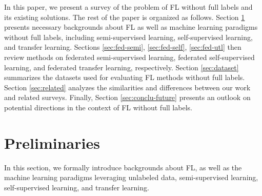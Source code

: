\documentclass[11pt]{article}
\begin{document}
In this paper, we present a survey of the problem of FL without full labels and its existing solutions. The rest of the paper is organized as follows. Section \ref{sec:prelim} presents necessary backgrounds about FL as well as machine learning paradigms without full labels, including semi-supervised learning, self-supervised learning, and transfer learning. Sections \ref{sec:fed-semi}, \ref{sec:fed-self}, \ref{sec:fed-utl} then review methods on federated semi-supervised learning, federated self-supervised learning, and federated transfer learning, respectively. Section \ref{sec:dataset} summarizes the datasets used for evaluating FL methods without full labels. Section \ref{sec:related} analyzes the similarities and differences between our work and related surveys. Finally, Section \ref{sec:conclu-future} presents an outlook on potential directions in the context of FL without full labels.



\section{Preliminaries}\label{sec:prelim}
In this section, we formally introduce backgrounds about FL, as well as the machine learning paradigms leveraging unlabeled data, semi-supervised learning, self-supervised learning, and transfer learning.
\end{document}
